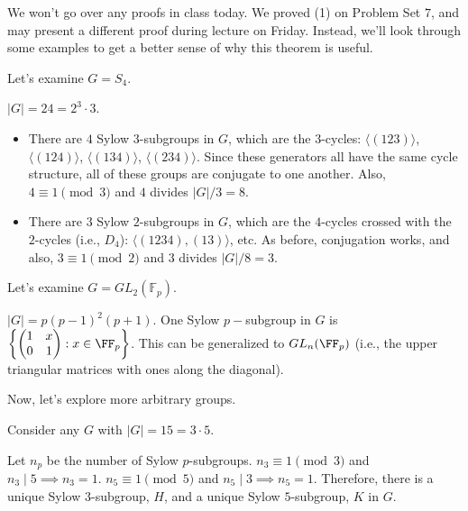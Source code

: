 We won't go over any proofs in class today. We proved (1) on Problem Set $7$, and may present a different proof during lecture on Friday. Instead, we'll look through some examples to get a better sense of why this theorem is useful. 

\begin{example}
\exlabel

Let's examine $G = S_4$.
\end{example}

$\vert G\vert = 24 = 2^3\cdot 3$. 
\begin{itemize}
    \item There are $4$ Sylow $3$-subgroups in $G$, which are the $3$-cycles: $\langle (1 2 3)\rangle$, $\langle (1 2 4)\rangle$, $\langle (1 3 4)\rangle$, $\langle (2 3 4)\rangle$. Since these generators all have the same cycle structure, all of these groups are conjugate to one another. Also, $4\equiv 1\pmod{3}$ and $4$ divides $\vert G\vert/3=8$.
    \item There are $3$ Sylow $2$-subgroups in $G$, which are the $4$-cycles crossed with the $2$-cycles (i.e., $D_4$): $\langle (1 2 3 4), (1 3)\rangle$, etc. As before, conjugation works, and also, $3\equiv 1\pmod{2}$ and $3$ divides $\vert G\vert/8=3$.
\end{itemize}

\begin{example}
\exlabel

Let's examine $G = GL_2(\mathbb{F}_p)$.
\end{example}

$\vert G\vert = p(p-1)^2(p+1)$. One Sylow $p-$subgroup in $G$ is $\left\{
\begin{pmatrix}1 & x \\ 0 & 1\end{pmatrix} : x\in \FF_p\right\}$. This can be generalized to $GL_n(\FF_p)$ (i.e., the upper triangular matrices with ones along the diagonal).

Now, let's explore more arbitrary groups.

\begin{example}
\exlabel

Consider any $G$ with $\vert G\vert = 15 = 3\cdot 5$. 
\end{example}

Let $n_p$ be the number of Sylow $p$-subgroups. $n_3\equiv 1\pmod{3}$ and $n_3\mid 5 \implies n_3=1$. $n_5\equiv 1\pmod{5}$ and $n_5\mid 3\implies n_5=1$. Therefore, there is a unique Sylow $3$-subgroup, $H$, and a unique Sylow $5$-subgroup, $K$ in $G$.


